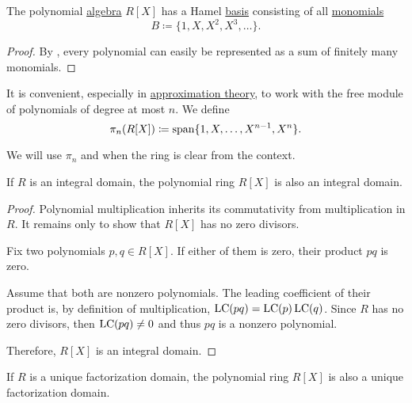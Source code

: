 \begin{proposition}\label{thm:polynomial_algebra_basis}
  The polynomial \hyperref[def:algebra_of_polynomials]{algebra} \( R[X] \) has a Hamel \hyperref[def:left_module_hamel_basis]{basis} consisting of all \hyperref[def:polynomial/monomial]{monomials}
  \begin{equation*}
    B \coloneqq \{ 1, X, X^2, X^3, \ldots \}.
  \end{equation*}
\end{proposition}
\begin{proof}
  By , every polynomial can easily be represented as a sum of finitely many monomials.
\end{proof}

\begin{definition}\label{def:polynomial_free_module}
  It is convenient, especially in \hyperref[sec:approximation_theory]{approximation theory}, to work with the free module of polynomials of degree at most \( n \). We define
  \begin{equation*}
    \pi_n(R[X]) \coloneqq \operatorname{span} \{ 1, X, \ldots, X^{n-1}, X^n \}.
  \end{equation*}

  We will use \( \pi_n \) and when the ring is clear from the context.
\end{definition}

\begin{proposition}\label{thm:polynomials_over_integral_domain_are_integral_domain}
  If \( R \) is an integral domain, the polynomial ring \( R[X] \) is also an integral domain.
\end{proposition}
\begin{proof}
  Polynomial multiplication inherits its commutativity from multiplication in \( R \). It remains only to show that \( R[X] \) has no zero divisors.

  Fix two polynomials \( p, q \in R[X] \). If either of them is zero, their product \( pq \) is zero.

  Assume that both are nonzero polynomials. The leading coefficient of their product is, by definition of multiplication, \( \operatorname{LC}(pq) = \operatorname{LC}(p) \operatorname{LC}(q) \). Since \( R \) has no zero divisors, then \( \operatorname{LC}(pq) \neq 0 \) and thus \( pq \) is a nonzero polynomial.

  Therefore, \( R[X] \) is an integral domain.
\end{proof}

\begin{proposition}\label{thm:polynomials_over_unique_factorization_domain_are_unique_factorization_domain}
  If \( R \) is a unique factorization domain, the polynomial ring \( R[X] \) is also a unique factorization domain.
\end{proposition}

